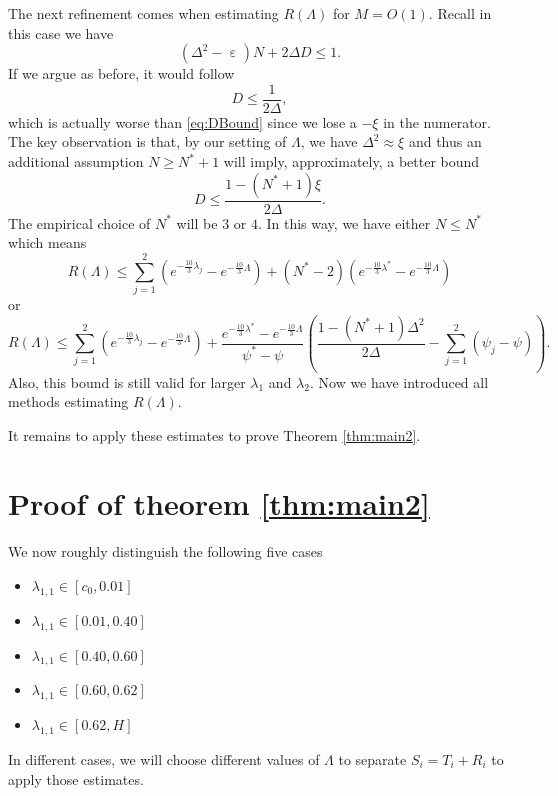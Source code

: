 \documentclass[10pt, reqno]{amsart}
\numberwithin{equation}{section}
\newcommand{\bb}[1]{\left(#1\right)}
\renewcommand{\epsilon }{\operatorname{\varepsilon}}
\begin{document}
The next refinement comes when estimating $R(\Lambda)$ for $M=O(1)$. Recall in this case we have
\begin{equation}\label{eq:Basic2M}
(\Delta^2-\epsilon)N+2\Delta D\leq 1.
\end{equation}
If we argue as before, it would follow
\begin{equation}\label{eq:DBoundM}
D\leq \frac{1}{2\Delta},
\end{equation}
which is actually worse than \eqref{eq:DBound} since we lose a $-\xi$ in the numerator. The key observation is that, by our setting of $\Lambda$, we have $\Delta^2\approx \xi$ and thus an additional assumption $N\geq N^*+1$ will imply, approximately, a better bound
\begin{equation}\label{eq:DBoundM2}
D\leq \frac{1-(N^*+1)\xi}{2\Delta}.
\end{equation}
The empirical choice of $N^*$ will be $3$ or $4$. In this way, we have either $N\leq N^*$ which means
\begin{equation}\label{eq:RCase1}
R(\Lambda)\leq \sum_{j=1}^2(e^{-\frac{10}{3}\lambda_{j}}-e^{-\frac{10}{3}\Lambda})+(N^*-2)(e^{-\frac{10}{3}\lambda^*}-e^{-\frac{10}{3}\Lambda})
\end{equation}
or
\begin{equation}\label{eq:RCase2}
R(\Lambda)\leq \sum_{j=1}^2(e^{-\frac{10}{3}\lambda_{j}}-e^{-\frac{10}{3}\Lambda})+\frac{e^{-\frac{10}{3}\lambda^*}-e^{-\frac{10}{3}\Lambda}}{\psi^*-\psi} \bb{\frac{1-(N^*+1)\Delta^2}{2\Delta}-\sum_{j=1}^2(\psi_j-\psi)}.
\end{equation}
Also, this bound is still valid for larger $\lambda_1$ and $\lambda_2$. Now we have introduced all methods estimating $R(\Lambda)$.

It remains to apply these estimates to prove Theorem \ref{thm:main2}.

\section{Proof of theorem \ref{thm:main2}}\label{sec:ProofTheorem2}

We now roughly distinguish the following five cases
\begin{itemize}
\item $\lambda_{1,1}\in [c_0,0.01]$
\item $\lambda_{1,1}\in [0.01,0.40]$
\item $\lambda_{1,1}\in [0.40,0.60]$
\item $\lambda_{1,1}\in [0.60,0.62]$
\item $\lambda_{1,1}\in [0.62,H]$
\end{itemize}
In different cases, we will choose different values of $\Lambda$ to separate $S_i=T_i+R_i$ to apply those estimates.
\end{document}
